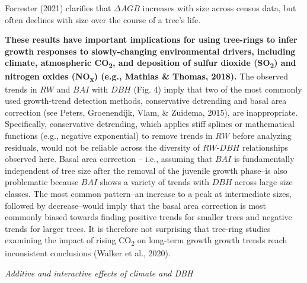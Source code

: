 \documentclass[
]{article}
\begin{document}
Forrester (2021) clarifies that \(\Delta AGB\) increases with size
across census data, but often declines with size over the course of a
tree's life.

\textbf{These results have important implications for using tree-rings
to infer growth responses to slowly-changing environmental drivers,
including climate, atmospheric CO\textsubscript{2}, and deposition of
sulfur dioxide (SO\textsubscript{2}) and nitrogen oxides
(NO\textsubscript{x}) (e.g., Mathias \& Thomas, 2018).} The observed
trends in \(RW\) and \(BAI\) with \(DBH\) (Fig. 4) imply that two of the
most commonly used growth-trend detection methods, conservative
detrending and basal area correction (see Peters, Groenendijk, Vlam, \&
Zuidema, 2015), are inappropriate. Specifically, conservative
detrending, which applies stiff splines or mathematical functions (e.g.,
negative exponential) to remove trends in \(RW\) before analyzing
residuals, would not be reliable across the diversity of \(RW\)-\(DBH\)
relationships observed here. Basal area correction -- i.e., assuming
that \(BAI\) is fundamentally independent of tree size after the removal
of the juvenile growth phase--is also problematic because \(BAI\) shows
a variety of trends with \(DBH\) across large size classes. The most
common pattern--an increase to a peak at intermediate sizes, followed by
decrease--would imply that the basal area correction is most commonly
biased towards finding positive trends for smaller trees and negative
trends for larger trees. It is therefore not surprising that tree-ring
studies examining the impact of rising CO\textsubscript{2} on long-term
growth growth trends reach inconsistent conclusions (Walker et al.,
2020).

\emph{Additive and interactive effects of climate and DBH}
\end{document}
